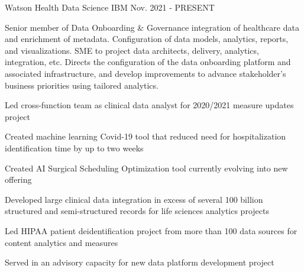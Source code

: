 

\begin{cventries}

  \cventry
    {Watson Health} %
    {Data Science} %
    {IBM} %
    {Nov. 2021 - PRESENT} %
    {
      \begin{cvparagraph}
        Senior member of Data Onboarding \& Governance integration of healthcare data and enrichment of metadata. Configuration of data models, analytics, reports, and visualizations. SME to project data architects, delivery, analytics, integration, etc. Directs the configuration of the data onboarding platform and associated infrastructure, and develop improvements to advance stakeholder’s business priorities using tailored analytics.
      \end{cvparagraph}
      \begin{cvitems} %
        \item {Led cross-function team as clinical data analyst for 2020/2021 measure updates project}
        \item {Created machine learning Covid-19 tool that reduced need for hospitalization identification time by up to two weeks}
        \item {Created AI Surgical Scheduling Optimization tool currently evolving into new offering}
        \item {Developed large clinical data integration in excess of several 100 billion structured and semi-structured records for life sciences analytics projects}
        \item {Led HIPAA patient deidentification project from more than 100 data sources for content analytics and measures}
        \item {Served in an advisory capacity for new data platform development project}
      \end{cvitems}
    }


\end{cventries}
